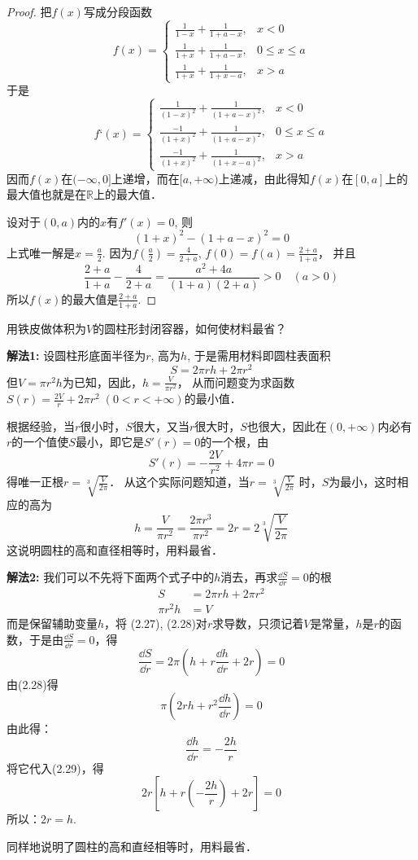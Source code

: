 \begin{proof}
把$f(x)$写成分段函数
\[f(x)=\begin{cases}
    \frac{1}{1-x}+\frac{1}{1+a-x}, & x<0\\
    \frac{1}{1+x}+\frac{1}{1+a-x}, & 0\le x\le a\\
    \frac{1}{1+x}+\frac{1}{1+x-a}, & x>a
\end{cases}\]
于是
\[f‘(x)=\begin{cases}
    \frac{1}{(1-x)^2}+\frac{1}{(1+a-x)^2}, & x<0\\
    \frac{-1}{(1+x)^2}+\frac{1}{(1+a-x)^2}, & 0\le x\le a\\
    \frac{-1}{(1+x)^2}+\frac{1}{(1+x-a)^2}, & x>a
\end{cases}\]
因而$f(x)$在$(-\infty, 0]$上递增，而在$[a,+\infty)$上递减，由此得知$f(x)$在$[0,a]$上的最大值也就是在$\mathbb{R}$上的最大值．

设对于$(0,a)$内的$x$有$f'(x)=0$, 则
\[(1+x)^2- (1+a-x)^2=0\]
上式唯一解是$x=\frac{a}{2}$. 
因为$f\left(\frac{a}{2}\right)=\frac{4}{2+a}$, $f(0)=f(a)=\frac{2+a}{1+a}$，
并且
\[\frac{2+a}{1+a}-\frac{4}{2+a}= \frac{a^2+4a}{(1+a) (2+a)}>0\quad  (a>0)\]
所以$f(x)$的最大值是$\frac{2+a}{1+a}$.
\end{proof}

\begin{example}
    用铁皮做体积为$V$的圆柱形封闭容器，如何使材料最省？
\end{example}


\begin{solution}
\textbf{解法1:} 设圆柱形底面半径为$r$, 高为$h$, 于是需用材料即圆柱表面积
\[S=2\pi rh+2\pi r^2\]
但$V=\pi r^2h$为已知，因此，$h=\frac{V}{\pi r^2}$，
从而问题变为求函数$S(r)=\frac{2V}{r}+2\pi r^2\; (0<r<+\infty)$的最小值．

根据经验，当$r$很小时，$S$很大，又当$r$很大时，$S$也很大，因此在$(0,+\infty)$内必有$r$的一个值使$S$最小，即它是$S'(r)=0$的一个根，由
\[S' (r) =-\frac{2V}{r^2}+4\pi r=0\]
得唯一正根$r=\sqrt[3]{\frac{V}{2\pi}}$．
从这个实际问题知道，当$r=\sqrt[3]{\frac{V}{2\pi}}$
时，$S$为最小，这时相应的高为
\[h=\frac{V}{\pi r^2}=\frac{2\pi r^3}{\pi r^2}=2r=2\sqrt[3]{\frac{V}{2\pi}}\]
这说明圆柱的高和直径相等时，用料最省．

\textbf{解法2:}  我们可以不先将下面两个式子中的$h$消去，再求$\frac{\dd S}{\dd r}=0$的根
\begin{align}
    S&=2\pi r h+2\pi r^2\\
    \pi r^2 h&=V
\end{align}
而是保留辅助变量$h$，将
(2.27), (2.28)对$r$求导数，只须记着$V$是常量，$h$是$r$的函数，于是由$\frac{\dd S}{\dd r}=0$，得
\begin{equation}
    \frac{\dd S}{\dd r}=2\pi\left(h+r\frac{\dd h}{\dd r}+2r\right)=0
\end{equation}
由(2.28)得
\begin{equation}
    \pi\left(2rh+r^2\frac{\dd h}{\dd r}\right)=0
\end{equation}
由此得：
\[\frac{\dd h}{\dd r}=-\frac{2h}{r}\]
将它代入(2.29)，得
\[2r\left[h+r\left(-\frac{2h}{r}\right)+2r\right]=0\]
所以：$2r=h$. 

同样地说明了圆柱的高和直经相等时，用料最省．
\end{solution}



